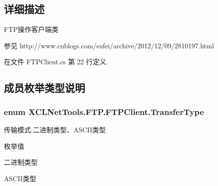 \subsection{详细描述}
F\-T\-P操作客户端类 \begin{DoxySeeAlso}{参见}
http\-://www.\-cnblogs.\-com/sufei/archive/2012/12/09/2810197.\-html


\end{DoxySeeAlso}




在文件 F\-T\-P\-Client.\-cs 第 22 行定义.



\subsection{成员枚举类型说明}
\hypertarget{class_x_c_l_net_tools_1_1_f_t_p_1_1_f_t_p_client_adef28404af1c916d9bd2bfbfa924b707}{
\subsubsection[{Transfer\-Type}]{\setlength{\rightskip}{0pt plus 5cm}enum {\bf X\-C\-L\-Net\-Tools.\-F\-T\-P.\-F\-T\-P\-Client.\-Transfer\-Type}}}\label{class_x_c_l_net_tools_1_1_f_t_p_1_1_f_t_p_client_adef28404af1c916d9bd2bfbfa924b707}


传输模式\-:二进制类型、\-A\-S\-C\-I\-I类型 

\begin{Desc}
\item[枚举值]\par
\begin{description}
\item[{\em 
\hypertarget{class_x_c_l_net_tools_1_1_f_t_p_1_1_f_t_p_client_adef28404af1c916d9bd2bfbfa924b707a6ce976e8f061b2b5cfe4d0c50c3405dd}{Binary}\label{class_x_c_l_net_tools_1_1_f_t_p_1_1_f_t_p_client_adef28404af1c916d9bd2bfbfa924b707a6ce976e8f061b2b5cfe4d0c50c3405dd}
}]二进制类型 \item[{\em 
\hypertarget{class_x_c_l_net_tools_1_1_f_t_p_1_1_f_t_p_client_adef28404af1c916d9bd2bfbfa924b707ad2cd8253361a9c732d21ca1d336599cc}{A\-S\-C\-I\-I}\label{class_x_c_l_net_tools_1_1_f_t_p_1_1_f_t_p_client_adef28404af1c916d9bd2bfbfa924b707ad2cd8253361a9c732d21ca1d336599cc}
}]A\-S\-C\-I\-I类型 \end{description}
\end{Desc}


